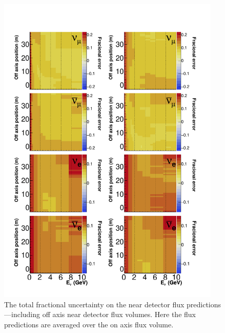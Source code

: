 \documentclass{article}
\begin{document}
\begin{figure}
  \centering
  \includegraphics[width=0.95\textwidth]{plots/EvUncerts_offaxis_total}
  \caption{The total fractional uncertainty on the near detector flux predictions---including off axis near detector flux volumes. Here the flux predictions are averaged over the on axis flux volume.}
  \label{fig:evfreedom_offaxis_total}
\end{figure}
\end{document}
